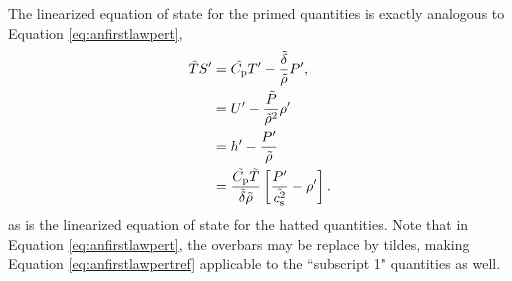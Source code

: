 \documentclass[12pt]{article}
\newcommand{\vecf}{\bm{F}}
\begin{document}
The linearized equation of state for the primed quantities is exactly analogous to Equation \eqref{eq:anfirstlawpert},
\begin{subequations}\label{eq:anfirstlawpertref}
	\begin{align}
		\tilde{T} S^\prime &= \tilde{C_{\rm{p}}} T^\prime - \frac{\tilde{\delta} }{\tilde{\rho}} P^\prime,\\
  	&= U^\prime - \frac{\tilde{P}}{\tilde{\rho}^2}\rho^\prime \label{eq:linuref}\\
&= h^\prime - \frac{P^\prime}{\tilde{\rho}}\\
		&= \frac{\tilde{C_{\rm{p}}} \tilde{T}}{\tilde{\delta} \tilde{\rho}}\left[\frac{P^\prime}{\tilde{c_{\rm s}^2}}-\rho^\prime\right].
	\end{align}
\end{subequations}
as is the linearized equation of state for the hatted quantities. Note that in Equation \eqref{eq:anfirstlawpert}, the overbars may be replace by tildes, making Equation \eqref{eq:anfirstlawpertref} applicable to the ``subscript 1" quantities as well. 
\end{document}
